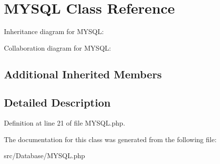 \hypertarget{class_zest_1_1_database_1_1_m_y_s_q_l}{}\section{M\+Y\+S\+QL Class Reference}
\label{class_zest_1_1_database_1_1_m_y_s_q_l}


Inheritance diagram for M\+Y\+S\+QL\+:


Collaboration diagram for M\+Y\+S\+QL\+:
\subsection*{Additional Inherited Members}


\subsection{Detailed Description}


Definition at line 21 of file M\+Y\+S\+Q\+L.\+php.



The documentation for this class was generated from the following file\+:\begin{DoxyCompactItemize}
\item 
src/\+Database/M\+Y\+S\+Q\+L.\+php\end{DoxyCompactItemize}
